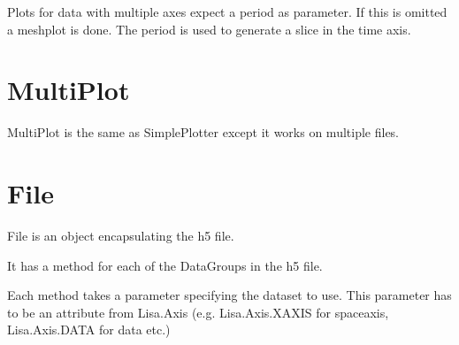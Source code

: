 \documentclass[letterpaper,10pt,openany,oneside,english]{sphinxmanual}
\begin{document}
Plots for data with multiple axes expect a period as parameter. If this is omitted a meshplot is done.
The period is used to generate a slice in the time axis.

\begin{sphinxVerbatim}[commandchars=\\\{\}]
 
  
 
\end{sphinxVerbatim}


\section{MultiPlot}
\label{\detokenize{simpleusage:multiplot}}
MultiPlot is the same as SimplePlotter except it works on multiple files.

\begin{sphinxVerbatim}[commandchars=\\\{\}]
 
  
  
\end{sphinxVerbatim}


\section{File}
\label{\detokenize{simpleusage:file}}
File is an object encapsulating the h5 file.

It has a method for each of the DataGroups in the h5 file.

Each method takes a parameter specifying the dataset to use. This parameter has to be an attribute from
Lisa.Axis (e.g. Lisa.Axis.XAXIS for spaceaxis, Lisa.Axis.DATA for data etc.)
\end{document}
